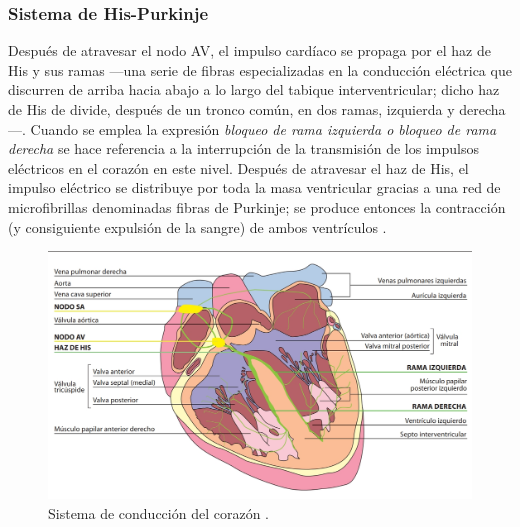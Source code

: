 \documentclass[12pt,letterpaper,oneside,openright]{book}
\begin{document}
	\subsubsection{Sistema de His-Purkinje}
	Después de atravesar el nodo AV, el impulso cardíaco se propaga por el haz de His y sus ramas ---una serie de fibras especializadas en la conducción eléctrica que discurren de arriba hacia abajo a lo largo del tabique interventricular; dicho haz de His de divide, después de un tronco común, en dos ramas, izquierda y derecha---. Cuando se emplea la expresión \textit{bloqueo de rama izquierda o bloqueo de rama derecha} se hace referencia a la interrupción de la transmisión de los impulsos eléctricos en el corazón en este nivel. Después de atravesar el haz de His, el impulso eléctrico se distribuye por toda la masa ventricular gracias a una red de microfibrillas denominadas fibras de Purkinje; se produce entonces la contracción (y consiguiente expulsión de la sangre) de ambos ventrículos \cite{fbbva}.
	\begin{figure}[h]
		\centering
		\includegraphics[width=0.95\linewidth]{Sem_1/figuras/Sistema_de_conduccion_corazon.jpeg}
		\caption{Sistema de conducción del corazón \cite{fbbva}.}
		\label{fig:sis_cond_heart}
	\end{figure}
\end{document}

